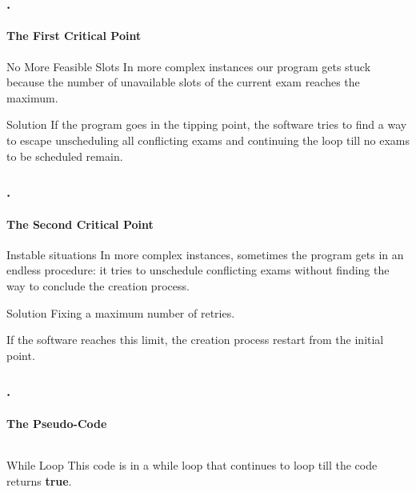 \documentclass{beamer}
\begin{document}
\begin{frame}
\frametitle{\thesection.\thesubsection \ \insertsubsection}
\framesubtitle{The First Critical Point}
\begin{alertblock}{No More Feasible Slots}
	In more complex instances our program gets stuck because the number of unavailable slots of the current exam reaches the maximum.
\end{alertblock}
\pause
\begin{block}{Solution}
	 If the program goes in the tipping point, the software tries to find a way to escape \alert{unscheduling all conflicting exams} and continuing the loop till no exams to be scheduled remain.
\end{block}

\end{frame}

\begin{frame}
\frametitle{\thesection.\thesubsection \ \insertsubsection}
\framesubtitle{The Second Critical Point}
\begin{alertblock}{Instable situations}
	In more complex instances, sometimes the program gets in an endless procedure: it tries to unschedule conflicting exams \alert{without finding the way to conclude} the creation process.

\end{alertblock}
\pause
\begin{block}{Solution}
	\alert{Fixing a maximum number of retries}.
	
	If the software reaches this limit, the creation process restart from the initial point.
\end{block}

\end{frame}

	\begin{frame}
	\frametitle{\thesection.\thesubsection \ \insertsubsection}
	\framesubtitle{The Pseudo-Code}
	\begin{columns}[onlytextwidth]
\begin{block}{While Loop}
	This code is in a while loop that continues to loop till the code returns \textbf{true}.
\end{block}
\end{columns}
	\end{frame}
\end{document}
